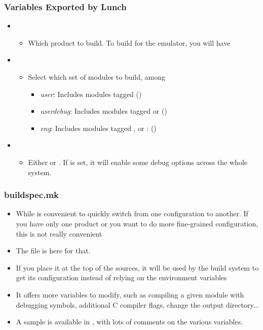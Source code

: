 \begin{frame}
  \frametitle{Variables Exported by Lunch}
  \begin{itemize}
  \item {}
    \begin{itemize}
    \item Which product to build. To build for the emulator, you will
      have 
    \end{itemize}
  \item {}
    \begin{itemize}
    \item Select which set of modules to build, among
      \begin{itemize}
      \item \emph{user}: Includes modules tagged 
        ()
      \item \emph{userdebug}: Includes modules tagged  or
         ()
      \item \emph{eng}: Includes modules tagged , 
        or : ()
      \end{itemize}
    \end{itemize}
  \item {}
    \begin{itemize}
    \item Either  or . If  is
      set, it will enable some debug options across the whole system.
    \end{itemize}
  \end{itemize}
\end{frame}

\begin{frame}
  \frametitle{buildspec.mk}
  \begin{itemize}
  \item While  is convenient to quickly switch from one
    configuration to another. If you have only one product or
    you want to do more fine-grained configuration, this is not
    really convenient
  \item The file  is here for that.
  \item If you place it at the top of the sources, it will be used by
    the build system to get its configuration instead of relying on
    the environment variables
  \item It offers more variables to modify, such as compiling a
    given module with debugging symbols, additional C compiler
    flags, change the output directory...
  \item A sample is available in ,
    with lots of comments on the various variables.
  \end{itemize}
\end{frame}
